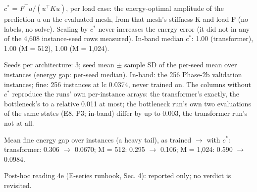 \begin{table}[t]
\smallskip
\begin{minipage}{\linewidth}\footnotesize\raggedright
$c^*$ = $F^\top u / (u^\top K u)$, per load case: the energy-optimal amplitude of the prediction u on the evaluated mesh, from that mesh's stiffness K and load F (no labels, no solve). Scaling by $c^*$ never increases the energy error (it did not in any of the 4,608 instance-seed rows measured). In-band median $c^*$: 1.00 (transformer), 1.00 (M = 512), 1.00 (M = 1,024).\par
Seeds per architecture: 3; seed mean $\pm$ sample SD of the per-seed mean over instances (energy gap: per-seed median). In-band: the 256 Phase-2b validation instances; fine: 256 instances at lc 0.0374, never trained on. The columns without $c^*$ reproduce the runs' own per-instance arrays: the transformer's exactly, the bottleneck's to a relative 0.011 at most; the bottleneck run's own two evaluations of the same states (E8, P3; in-band) differ by up to 0.003, the transformer run's not at all.\par
Mean fine energy gap over instances (a heavy tail), as trained $\rightarrow$ with $c^*$: transformer: 0.306 $\rightarrow$ 0.0670; M = 512: 0.295 $\rightarrow$ 0.106; M = 1,024: 0.590 $\rightarrow$ 0.0984.\par
Post-hoc reading 4e (E-series runbook, Sec. 4): reported only; no verdict is revisited.
\end{minipage}
\end{table}
